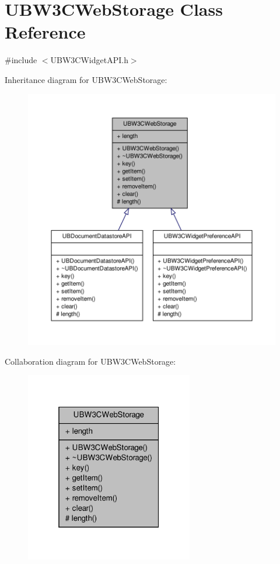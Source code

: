 \hypertarget{class_u_b_w3_c_web_storage}{\section{U\-B\-W3\-C\-Web\-Storage Class Reference}
\label{db/de3/class_u_b_w3_c_web_storage}
}


{\ttfamily \#include $<$U\-B\-W3\-C\-Widget\-A\-P\-I.\-h$>$}



Inheritance diagram for U\-B\-W3\-C\-Web\-Storage\-:
\nopagebreak
\begin{figure}[H]
\begin{center}
\leavevmode
\includegraphics[width=350pt]{d2/d6f/class_u_b_w3_c_web_storage__inherit__graph}
\end{center}
\end{figure}


Collaboration diagram for U\-B\-W3\-C\-Web\-Storage\-:
\nopagebreak
\begin{figure}[H]
\begin{center}
\leavevmode
\includegraphics[width=208pt]{d0/de8/class_u_b_w3_c_web_storage__coll__graph}
\end{center}
\end{figure}

